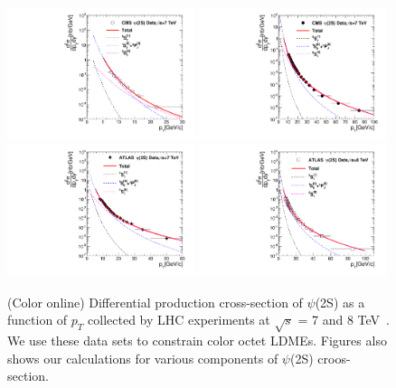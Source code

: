 \documentclass[aps,prc,preprint,superscriptaddress,showpacs,showkeys,amsmath]{revtex4-1}
\begin{document}



\begin{figure}
\includegraphics[width=0.49\textwidth]{Figures/Psi2S/Psi2S_CMS_LowPt.pdf}
\includegraphics[width=0.49\textwidth]{Figures/Psi2S/Psi2S_CMS_HighPt.pdf}
\includegraphics[width=0.49\textwidth]{Figures/Psi2S/Psi2S_ATLAS.pdf}
\includegraphics[width=0.49\textwidth]{Figures/Psi2S/Psi2S_ATLAS_8TeV.pdf}
\caption{(Color online) Differential production cross-section of $\psi$(2S) as a function of $p_{T}$ 
collected by LHC experiments at $\sqrt{s}$ = 7 and 8 TeV~\cite{Chatrchyan:2011kc,Khachatryan:2015rra,Aad:2015duc}. 
We use these data sets to constrain color octet LDMEs. Figures also shows our calculations for various components 
of $\psi$(2S) croos-section.}
\label{Fig:LDMEPsi2S}
\end{figure}
\end{document}
